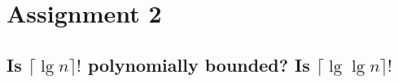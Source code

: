 \chapter{Assignment 2}

\section{Is $\lceil \lg n \rceil!$ polynomially bounded? Is $\lceil \lg \lg n \rceil!$}

